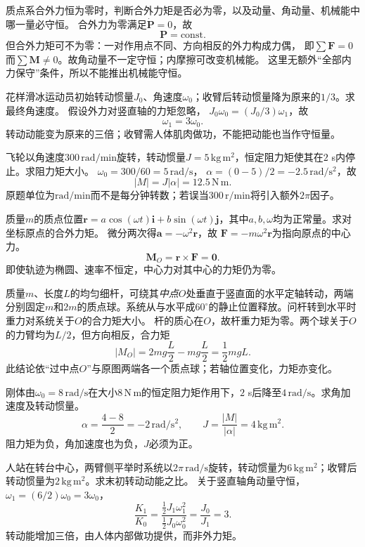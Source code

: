 \problemtext 质点系合外力恒为零时，判断合外力矩是否必为零，以及动量、角动量、机械能中哪一量必守恒。
\workings
合外力为零满足$\dot{\bm P}=0$，故
\[
\boxed{\bm P=\mathrm{const}}.
\]
但合外力矩可不为零：一对作用点不同、方向相反的外力构成力偶，
即$\sum\bm F=0$而$\sum\bm M\ne0$。故角动量不一定守恒；内摩擦可改变机械能。
\crosscheck 这里无额外“全部内力保守”条件，所以不能推出机械能守恒。

\problemtext 花样滑冰运动员初始转动惯量$J_0$、角速度$\omega_0$；收臂后转动惯量降为原来的$1/3$。求最终角速度。
\workings
假设外力对竖直轴的力矩忽略，
$J_0\omega_0=(J_0/3)\omega_1$，故
\[
\boxed{\omega_1=3\omega_0}.
\]
\crosscheck 转动动能变为原来的三倍；收臂需人体肌肉做功，不能把动能也当作守恒量。

\problemtext 飞轮以角速度$300\,\mathrm{rad/min}$旋转，转动惯量$J=5\,\mathrm{kg\,m^2}$，恒定阻力矩使其在$2$ s内停止。求阻力矩大小。
\workings
$\omega_0=300/60=5\,\mathrm{rad/s}$，
$\alpha=(0-5)/2=-2.5\,\mathrm{rad/s^2}$，故
\[
\boxed{|M|=J|\alpha|=12.5\,\mathrm{N\,m}}.
\]
\crosscheck 原题单位为$\mathrm{rad/min}$而不是每分钟转数；若误当$300\,\mathrm{r/min}$将引入额外$2\pi$因子。

\problemtext 质量$m$的质点位置$\bm r=a\cos(\omega t)\bm i+
b\sin(\omega t)\bm j$，其中$a,b,\omega$均为正常量。求对坐标原点的合外力矩。
\workings
微分两次得$\bm a=-\omega^2\bm r$，故
$\bm F=-m\omega^2\bm r$为指向原点的中心力。
\[
\boxed{\bm M_O=\bm r\times\bm F=\bm0}.
\]
\crosscheck 即使轨迹为椭圆、速率不恒定，中心力对其中心的力矩仍为零。

\problemtext 质量$m$、长度$L$的均匀细杆，可绕其\emph{中点}$O$处垂直于竖直面的水平定轴转动，两端分别固定$m$和$2m$的质点球。系统从与水平成$60^\circ$的静止位置释放。问杆转到水平时重力对系统关于$O$的合力矩大小。
\workings
杆的质心在$O$，故杆重力矩为零。两个球关于$O$的力臂均为$L/2$，但方向相反，合力矩
\[
\boxed{|M_O|=2mg\frac L2-mg\frac L2=\frac12mgL}.
\]
\crosscheck 此结论依“过中点$O$”与原图两端各一个质点球；若轴位置变化，力矩亦变化。

\problemtext 刚体由$\omega_0=8\,\mathrm{rad/s}$在大小$8\,\mathrm{N\,m}$的恒定阻力矩作用下，$2$ s后降至$4\,\mathrm{rad/s}$。求角加速度及转动惯量。
\workings
\[
\boxed{\alpha=\frac{4-8}{2}=-2\,\mathrm{rad/s^2}},
\qquad
\boxed{J=\frac{|M|}{|\alpha|}=4\,\mathrm{kg\,m^2}}.
\]
\crosscheck 阻力矩为负，角加速度也为负，$J$必须为正。

\problemtext 人站在转台中心，两臂侧平举时系统以$2\pi\,\mathrm{rad/s}$旋转，转动惯量为$6\,\mathrm{kg\,m^2}$；收臂后转动惯量为$2\,\mathrm{kg\,m^2}$。求末初转动动能之比。
\workings
关于竖直轴角动量守恒，$\omega_1=(6/2)\omega_0=3\omega_0$，
\[
\boxed{\frac{K_1}{K_0}
=\frac{\tfrac12J_1\omega_1^2}{\tfrac12J_0\omega_0^2}
=\frac{J_0}{J_1}=3}.
\]
\crosscheck 转动能增加三倍，由人体内部做功提供，而非外力矩。
